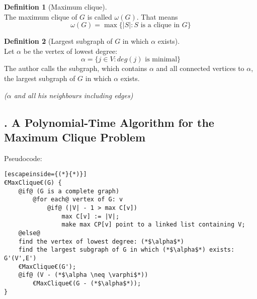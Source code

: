 \documentclass[12pt, xcolor=dvipsnames]{scrartcl}
\theoremstyle{definition}
\newtheorem{definition}{Definition}%
\theoremstyle{definition}
\begin{document}
\begin{definition}[Maximum clique]\ \\
    The maximum clique of $G$ is called $\omega (G)$. That means  
    \[ \omega (G) = \max\{|S| : S \text{ is a clique in }G\} \]
\end{definition}

\begin{definition}[Largest subgraph of $G$ in which $\alpha$ exists]\ \\
    Let $\alpha$ be the vertex of lowest degree:
    \[ \alpha = \{j \in V : deg(j) \text{ is minimal}\} \]
    The author calls the subgraph, which contains $\alpha$ and all connected vertices to $\alpha$, the largest subgraph of $G$ in which $\alpha$ exists.

    \textit{($\alpha$ and all his neighbours including edges)}
\end{definition}

\subsection*{. A Polynomial-Time Algorithm for the Maximum Clique Problem}

Pseudocode:


\lstset{style=mystyle}

\begin{lstlisting}[escapeinside={(*}{*)}]
€MaxClique€(G) {
    @if@ (G is a complete graph)
        @for each@ vertex of G: v
            @if@ (|V| - 1 > max C[v])
                max C[v] := |V|;
                make max CP[v] point to a linked list containing V;
    @else@
    find the vertex of lowest degree: (*$\alpha$*)
    find the largest subgraph of G in which (*$\alpha$*) exists: G'(V',E')
    €MaxClique€(G');
    @if@ (V - (*$\alpha \neq \varphi$*))
        €MaxClique€(G - (*$\alpha$*));
}
\end{lstlisting}
\end{document}
